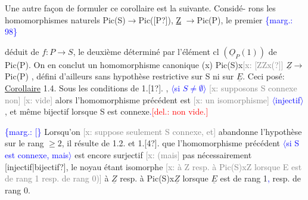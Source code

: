 \documentclass[11pt]{article}
\newcommand{\scanpage}[1]{\par\bigskip\noindent{\small\sffamily[scan #1]}\par}
\newcommand{\mspage}[1]{{\small\sffamily[p.\,#1]}}
\newcommand{\hand}[1]{\textcolor{blue}{#1}}
\newcommand{\inserted}[2][]{\textcolor{blue}{$\langle$#2$\rangle$}}
\newcommand{\margin}[1]{\textcolor{blue}{\{\textsf{marg.:} #1\}}}
\newcommand{\deleted}[1]{\textcolor{red}{[\textsf{del.:} #1]}}
\newcommand{\xout}[1]{\textcolor{gray}{[\textsf{x:} #1]}}
\newcommand{\uline}[1]{\underline{#1}}
\newcommand{\unsure}[1]{[#1?]}
\begin{document}
Une autre façon de formuler ce corollaire est la suivante. Considé-%
rons les homomorphismes naturels Pic(S)$\longrightarrow$Pic(\unsure{P}), \underline{Z} $\longrightarrow$Pic(P), le premier
\margin{98}

\clearpage
\scanpage{25/99}
\mspage{2}

déduit de $f:P\longrightarrow S$, le deuxième  déterminé par l'élément  cl $(\underline{O}_P(1))$ de
Pic(P). On en conclut un homomorphisme canonique
(x) \qquad Pic(S)x\xout{\unsure{ZZx(}} $\underline{Z} \longrightarrow$ Pic(P)  ,
défini d'ailleurs sans hypothèse restrictive sur S ni sur $\underline{E}$.  Ceci posé:
\uline{Corollaire} 1.4.   Sous les conditions de 1.\unsure{1}. , \inserted{si $S\neq\emptyset$} \xout{supposons S connexe non}
\xout{vide} alors l'homomorphisme précédent est \xout{un isomorphisme} \inserted[typed]{injectif} , et même
bijectif lorsque S est connexe\hand{.}\deleted{non vide.}

\margin{[} Lorsqu'on \xout{suppose seulement S connexe, et} abandonne l'hypothèse
sur le rang $\geqslant 2$,  il résulte de 1.2. et 1.\unsure{4}. que l'homomorphisme précédent
\inserted[typed]{si S est connexe, mais}
est encore surjectif \xout{(mais} pas nécessairement \unsure{injectif|bijectif}, le noyau étant
isomorphe \xout{à Z resp. à Pic(S)xZ lorsque E est de rang 1 resp. de rang 0)}
à $\underline{Z}$  resp. à  Pic(S)x$\underline{Z}$  lorsque  $\underline{E}$  est de rang 1\hand{,} resp. de rang 0.
\end{document}
